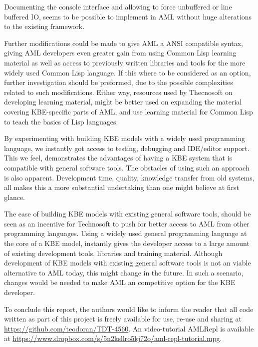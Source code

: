 Documenting the console interface and allowing to force unbuffered or line buffered IO, seems to be possible to implement in AML without huge alterations to the existing framework.

Further modifications could be made to give AML a ANSI compatible syntax, giving AML developers even greater gain from using Common Lisp learning material as well as access to previously written libraries and tools for the more widely used Common Lisp language. If this where to be considered as an option, further investigation should be preformed, due to the possible complexities related to such modifications. Either way, resources used by Thecnosoft on developing learning material, might be better used on expanding the material covering KBE-specific parts of AML, and use learning material for Common Lisp to teach the basics of Lisp languages.

By experimenting with building KBE models with a widely used programming language, we instantly got access to testing, debugging and IDE/editor support. This we feel, demonstrates the advantages of having a KBE system that is compatible with general software tools. The obstacles of using such an approach is also apparent. Development time, quality, knowledge transfer from old systems, all makes this a more substantial undertaking than one might believe at first glance.

The ease of building KBE models with existing general software tools, should be seen as an incentive for Technosoft to push for better access to AML from other programming languages. Using a widely used general programming language at the core of a KBE model, instantly gives the developer access to a large amount of existing development tools, libraries and training material. Although development of KBE models with existing general software tools is not an viable alternative to AML today, this might change in the future. In such a scenario, changes would be needed to make AML an competitive option for the KBE developer.

To conclude this report, the authors would like to inform the reader that all code written as part of this project is freely available for use, re-use and sharing at \url{https://github.com/teodoran/TDT-4560}. An video-tutorial AMLRepl is available at \url{https://www.dropbox.com/s/5n2ksllro5kj72o/aml-repl-tutorial.mpg}.
